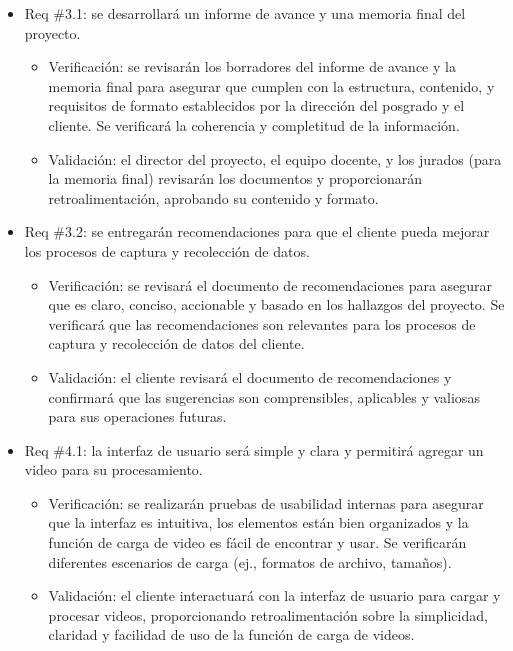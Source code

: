 \documentclass[
11pt, %
]{charter}
\begin{document}
\begin{itemize}
	\item Req \#3.1: se desarrollará un informe de avance y una memoria final del proyecto.
	\begin{itemize}
		\item Verificación: se revisarán los borradores del informe de avance y la memoria final para asegurar que cumplen con la estructura, contenido, y requisitos de formato establecidos por la dirección del posgrado y el cliente. Se verificará la coherencia y completitud de la información.
		\item Validación: el director del proyecto, el equipo docente, y los jurados (para la memoria final) revisarán los documentos y proporcionarán retroalimentación, aprobando su contenido y formato. 
	\end{itemize}
	
	\item Req \#3.2: se entregarán recomendaciones para que el cliente pueda mejorar los procesos de captura y recolección de datos.
	\begin{itemize}
		\item Verificación: se revisará el documento de recomendaciones para asegurar que es claro, conciso, accionable y basado en los hallazgos del proyecto. Se verificará que las recomendaciones son relevantes para los procesos de captura y recolección de datos del cliente.
		\item Validación: el cliente revisará el documento de recomendaciones y confirmará que las sugerencias son comprensibles, aplicables y valiosas para sus operaciones futuras.
	\end{itemize}
	
	\item Req \#4.1: la interfaz de usuario será simple y clara y permitirá agregar un video para su procesamiento.
	\begin{itemize}
		\item Verificación: se realizarán pruebas de usabilidad internas para asegurar que la interfaz es intuitiva, los elementos están bien organizados y la función de carga de video es fácil de encontrar y usar. Se verificarán diferentes escenarios de carga (ej., formatos de archivo, tamaños).
		\item Validación: el cliente interactuará con la interfaz de usuario para cargar y procesar videos, proporcionando retroalimentación sobre la simplicidad, claridad y facilidad de uso de la función de carga de videos.
	\end{itemize}
	

\end{itemize}
\end{document}
